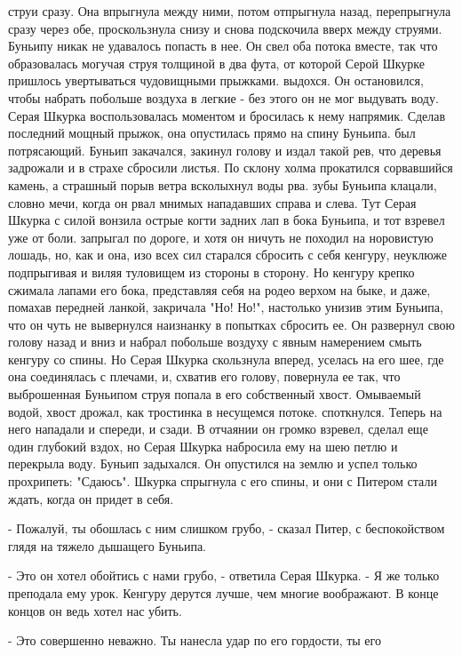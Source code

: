 струи сразу. Она впрыгнула между ними, потом отпрыгнула назад, 
перепрыгнула сразу через обе, проскользнула снизу и снова подскочила 
вверх между струями. Буньипу никак не удавалось попасть в нее. Он свел 
оба потока вместе, так что образовалась могучая струя толщиной в два 
фута, от которой Серой Шкурке пришлось увертываться чудовищными 
прыжками.
 выдохся. Он остановился, чтобы набрать побольше воздуха в 
легкие - без этого он не мог выдувать воду. Серая Шкурка 
воспользовалась моментом и бросилась к нему напрямик. Сделав последний 
мощный прыжок, она опустилась прямо на спину Буньипа.
 был потрясающий. Буньип закачался, закинул голову и издал 
такой рев, что деревья задрожали и в страхе сбросили листья. По склону 
холма прокатился сорвавшийся камень, а страшный порыв ветра всколыхнул 
воды рва.
 зубы Буньипа клацали, словно мечи, когда он рвал мнимых 
нападавших справа и слева. Тут Серая Шкурка с силой вонзила острые 
когти задних лап в бока Буньипа, и тот взревел уже от боли.
 запрыгал по дороге, и хотя он ничуть не походил на 
норовистую лошадь, но, как и она, изо всех сил старался сбросить с 
себя кенгуру, неуклюже подпрыгивая и виляя туловищем из стороны в 
сторону. Но кенгуру крепко сжимала лапами его бока, представляя себя 
на родео верхом на быке, и даже, помахав передней ланкой, закричала 
"Но! Но!", настолько унизив этим Буньипа, что он чуть не вывернулся 
наизнанку в попытках сбросить ее. Он развернул свою голову назад и 
вниз и набрал побольше воздуху с явным намерением смыть кенгуру со 
спины. Но Серая Шкурка скользнула вперед, уселась на его шее, где она 
соединялась с плечами, и, схватив его голову, повернула ее так, что 
выброшенная Буньипом струя попала в его собственный хвост. Омываемый 
водой, хвост дрожал, как тростинка в несущемся потоке.
 споткнулся. Теперь на него нападали и спереди, и сзади. В 
отчаянии он громко взревел, сделал еще один глубокий вздох, но Серая 
Шкурка набросила ему на шею петлю и перекрыла воду. Буньип задыхался. 
Он опустился на землю и успел только прохрипеть: "Сдаюсь".
 Шкурка спрыгнула с его спины, и они с Питером стали ждать, 
когда он придет в себя.
\par- Пожалуй, ты обошлась с ним слишком грубо, - сказал Питер, с 
беспокойством глядя на тяжело дышащего Буньипа.
\par- Это он хотел обойтись с нами грубо, - ответила Серая Шкурка. - Я 
же только преподала ему урок. Кенгуру дерутся лучше, чем многие 
воображают. В конце концов он ведь хотел нас убить.
\par- Это совершенно неважно. Ты нанесла удар по его гордости, ты его 
